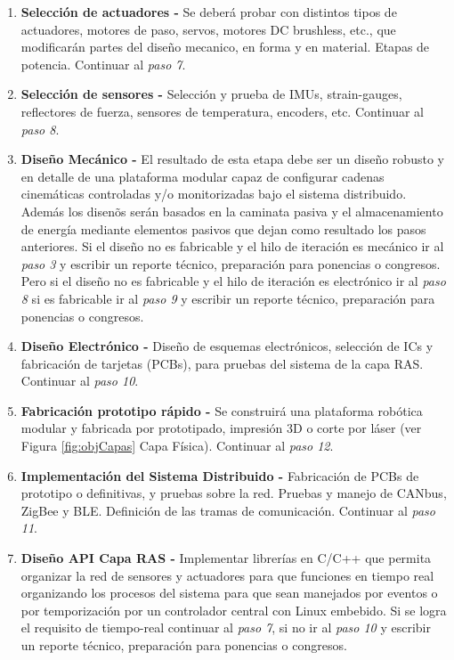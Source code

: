 {\begin{enumerate}
  \item \textbf{Selecci\'on de actuadores - } Se deber\'a probar con distintos tipos de actuadores, motores de paso, servos, motores DC brushless, etc., que modificar\'an partes del dise\~no mecanico, en forma y en material. Etapas de potencia. Continuar al \emph{paso 7}.\par
  \item \textbf{Selecci\'on de sensores - } Selecci\'on y prueba de IMUs, strain-gauges, reflectores de fuerza, sensores de temperatura, encoders, etc. Continuar al \emph{paso 8}.\par
  \item \textbf{Dise\~no Mec\'anico - } El resultado de esta etapa debe ser un dise\~no robusto y en detalle de una plataforma modular capaz de configurar cadenas cinem\'aticas controladas y/o monitorizadas bajo el sistema distribuido. Adem\'as los disen\~os ser\'an basados en la caminata pasiva y el almacenamiento de energ\'ia mediante elementos pasivos que dejan como resultado los pasos anteriores. Si el dise\~no no es fabricable y el hilo de iteraci\'on es mec\'anico ir al \emph{paso 3} y escribir un reporte t\'ecnico, preparaci\'on para ponencias o congresos. Pero si el dise\~no no es fabricable y el hilo de iteraci\'on es electr\'onico ir al \emph{paso 8} si es fabricable ir al \emph{paso 9} y escribir un reporte t\'ecnico, preparaci\'on para ponencias o congresos.\par
  \item \textbf{Dise\~no Electr\'onico - } Dise\~no de esquemas electrónicos, selección de ICs y fabricaci\'on de tarjetas (PCBs), para pruebas del sistema de la capa RAS. Continuar al \emph{paso 10}.\par
  \item \textbf{Fabricaci\'on prototipo r\'apido - } Se construir\'a una plataforma rob\'otica modular y fabricada por prototipado, impresión 3D o corte por láser (ver Figura \ref{fig:objCapas} Capa Física). Continuar al \emph{paso 12}.\par
  \item \textbf{Implementaci\'on del Sistema Distribuido - } Fabricaci\'on de PCBs de prototipo o definitivas, y pruebas sobre la red. Pruebas y manejo de CANbus, ZigBee y BLE. Definición de las tramas de comunicaci\'on. Continuar al \emph{paso 11}.\par
  \item \textbf{Dise\~no API Capa RAS - } Implementar librerías en C/C++ que permita organizar la red de sensores y actuadores para que funciones en tiempo real organizando los procesos del sistema para que sean manejados por eventos o por temporizaci\'on por un controlador central con Linux embebido. Si se logra el requisito de tiempo-real continuar al \emph{paso 7}, si no ir al \emph{paso 10} y escribir un reporte t\'ecnico, preparaci\'on para ponencias o congresos.\par

\end{enumerate}}
